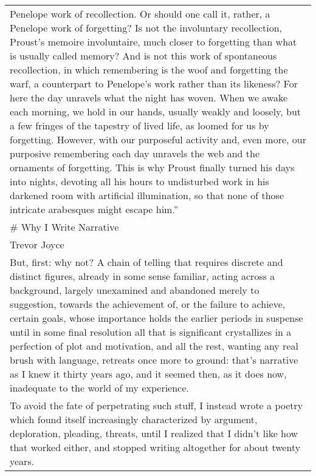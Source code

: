 \begin{longtable}[]{@{}l@{}}
\begin{minipage}[t]{0.97\columnwidth}
Penelope work of recollection. Or should one call it, rather, a Penelope
work of forgetting? Is not the involuntary recollection, Proust's
memoire involuntaire, much closer to forgetting than what is usually
called memory? And is not this work of spontaneous recollection, in
which remembering is the woof and forgetting the warf, a counterpart to
Penelope's work rather than its likeness? For here the day unravels what
the night has woven. When we awake each morning, we hold in our hands,
usually weakly and loosely, but a few fringes of the tapestry of lived
life, as loomed for us by forgetting. However, with our purposeful
activity and, even more, our purposive remembering each day unravels the
web and the ornaments of forgetting. This is why Proust finally turned
his days into nights, devoting all his hours to undisturbed work in his
darkened room with artificial illumination, so that none of those
intricate arabesques might escape him.''\strut
\end{minipage}\tabularnewline
\begin{minipage}[t]{0.97\columnwidth}\raggedright
\# Why I Write Narrative\strut
\end{minipage}\tabularnewline
\begin{minipage}[t]{0.97\columnwidth}\raggedright
Trevor Joyce\strut
\end{minipage}\tabularnewline
\begin{minipage}[t]{0.97\columnwidth}\raggedright
But, first: why not? A chain of telling that requires discrete and
distinct figures, already in some sense familiar, acting across a
background, largely unexamined and abandoned merely to suggestion,
towards the achievement of, or the failure to achieve, certain goals,
whose importance holds the earlier periods in suspense until in some
final resolution all that is significant crystallizes in a perfection of
plot and motivation, and all the rest, wanting any real brush with
language, retreats once more to ground: that's narrative as I knew it
thirty years ago, and it seemed then, as it does now, inadequate to the
world of my experience.\strut
\end{minipage}\tabularnewline
\begin{minipage}[t]{0.97\columnwidth}\raggedright
To avoid the fate of perpetrating such stuff, I instead wrote a poetry
which found itself increasingly characterized by argument, deploration,
pleading, threats, until I realized that I didn't like how that worked
either, and stopped writing altogether for about twenty years.\strut
\end{minipage}\tabularnewline

\end{longtable}
